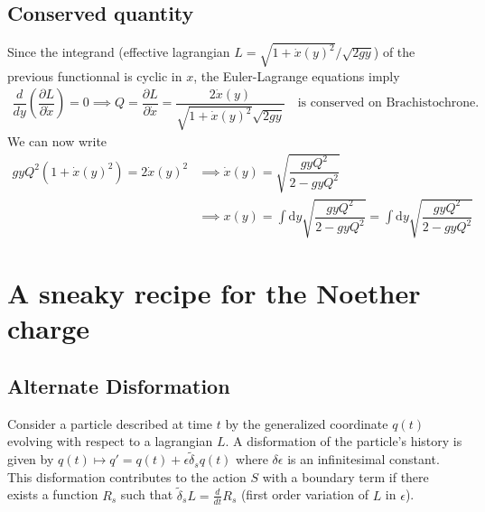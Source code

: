 \documentclass[12pt, a4paper]{article}
\begin{document}

%
\subsection{Conserved quantity}
Since the integrand (effective lagrangian $L = \sqrt{1 + \dot{x}(y)^2}/{\sqrt{2gy}}$) of the previous functionnal is cyclic in $x$, the Euler-Lagrange equations imply 
\begin{align*}
    \dfrac{d}{dy}\left(\dfrac{\partial L}{\partial \dot{x}}\right) = 0 \implies Q = \dfrac{\partial L}{\partial \dot{x}} =\dfrac{2\dot{x}(y)}{\sqrt{1 + \dot{x}(y)^2}\sqrt{2gy}} \quad \text{is conserved on Brachistochrone}.
\end{align*}
We can now write 
\begin{align*}
    gy Q^2(1 + \dot{x}(y)^2) = 2\dot{x}(y)^2 &\implies \dot{x}(y) = \sqrt{\dfrac{gy Q^2}{2-gy Q^2}}\\ 
    &\implies x(y) = \int \text{d} y \sqrt{\dfrac{gy Q^2}{2-gy Q^2}} = \int \text{d} y \sqrt{\dfrac{gy Q^2}{2-gy Q^2}} 
\end{align*}



\newpage

\section{A sneaky recipe for the Noether charge}
%
\subsection{Alternate Disformation}
Consider a particle described at time $t$ by the generalized coordinate $q(t)$ evolving with respect to a lagrangian $L$. A disformation of the particle's history is given by $q(t) \mapsto q' = q(t) +\epsilon \tilde{\delta}_s q(t)$ where $\delta \epsilon$ is an infinitesimal constant. This disformation contributes to the action $S$ with a boundary term if there exists a function $R_s$ such that $\tilde{\delta}_s L = \frac{d}{dt}R_s$ (first order variation of $L$ in $\epsilon$).
\end{document}

